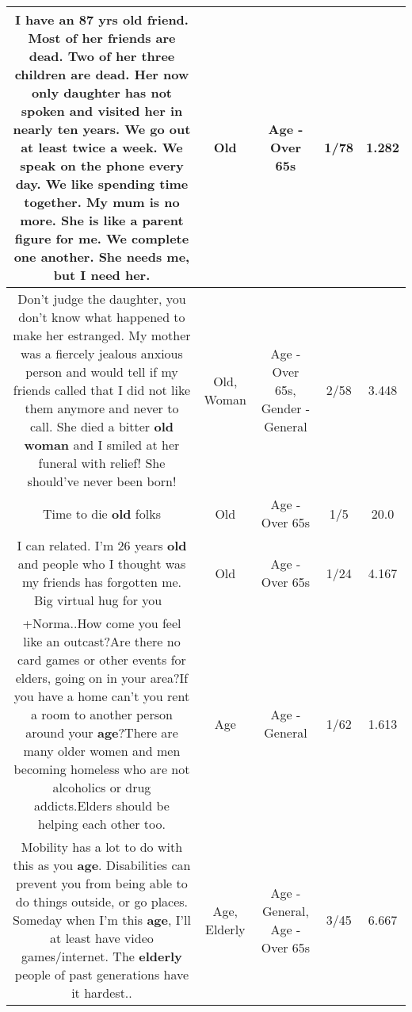 \documentclass[11pt]{article}
\newlength\mylength
\begin{document}
\begin{center}
\begin{longtable}{|C{.65\mylength}|C{.30\mylength}|C{.12\mylength}|C{.12\mylength}|C{.12\mylength}|}
  \small I have an 87 yrs \textbf{old} friend.  Most of her friends are dead. Two of her three children are dead.  Her now only daughter  has not spoken and visited her in nearly ten years.  We go out at least twice a week.  We speak on the phone every day.  We like spending time together.  My mum is no more.  She is like a parent figure for me.  We complete one another.  She needs me, but I need her.\normalsize   & Old & Age - Over 65s & 1/78 & 1.282 \\  \hline
  \small Don't judge the daughter, you don't know what happened to make her estranged. My mother was a fiercely jealous anxious person and would tell if my friends called that I did not like them anymore and never to call. She died a bitter \textbf{old} \textbf{woman} and I smiled at her funeral with relief! She should've never been born!\normalsize   & Old, Woman & Age - Over 65s, Gender - General & 2/58 & 3.448 \\  \hline
  \small Time to die \textbf{old} folks\normalsize   & Old & Age - Over 65s & 1/5 & 20.0 \\  \hline
  \small I can related. I'm 26 years \textbf{old} and people who I thought was my friends has forgotten me. Big virtual hug for you 💜\normalsize   & Old & Age - Over 65s & 1/24 & 4.167 \\  \hline
  \small +Norma..How come you feel like an outcast?Are there no card games or other events for elders, going on in your area?If you have a home can't you rent a room to another person around your \textbf{age}?There are many older women and men  becoming homeless who are not alcoholics or drug addicts.Elders should be helping each other too.\normalsize   & Age & Age - General & 1/62 & 1.613 \\  \hline
  \small Mobility has a lot to do with this as you \textbf{age}. Disabilities can prevent you from being able to do things outside, or go places. Someday when I'm this \textbf{age}, I'll at least have video games/internet. The \textbf{elderly} people of past generations have it hardest..\normalsize   & Age, Elderly & Age - General, Age - Over 65s & 3/45 & 6.667 \\  \hline

\end{longtable}
\end{center}
\end{document}
